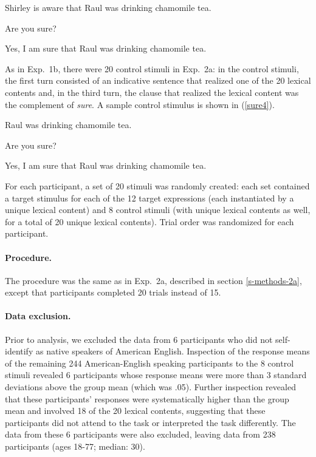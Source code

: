 \documentclass[11pt,fleqn]{article}
\newcommand{\6}{\mbox{$[\hspace*{-.6mm}[$}}
\newcommand{\9}{\mbox{$]\hspace*{-.6mm}]$}}
\begin{document}
\begin{exe}
\ex\label{sure3}
\begin{xlist}
 Shirley is aware that Raul was drinking chamomile tea.

 Are you sure?

 Yes, I am sure that Raul was drinking chamomile tea.
\end{xlist}
\end{exe}

As in Exp.~1b, there were 20 control stimuli in Exp.~2a: in the control stimuli, the first turn consisted of an indicative sentence that realized one of the 20 lexical contents and, in the third turn, the clause that realized the lexical content was the complement of {\em sure}. A sample control stimulus is shown in (\ref{sure4}).

\begin{exe}
\ex\label{sure4}
\begin{xlist}
 Raul was drinking chamomile tea.

 Are you sure?

 Yes, I am sure that Raul was drinking chamomile tea.
\end{xlist}
\end{exe}

For each participant, a set of 20 stimuli was randomly created: each set contained a target stimulus for each of the 12 target expressions (each instantiated by a unique lexical content) and 8 control stimuli (with unique lexical contents as well, for a total of 20 unique lexical contents). Trial order was randomized for each participant.

\paragraph{Procedure.} The procedure was the same as in Exp.~2a, described in section \ref{s-methods-2a}, except that participants completed 20 trials instead of 15.

\paragraph{Data exclusion.} Prior to analysis, we excluded the data from 6 participants who did not self-identify as native speakers of American English. Inspection of the response means of the remaining 244 American-English speaking participants to the 8 control stimuli revealed 6 participants whose response means were more than 3 standard deviations above the group mean (which was .05). Further inspection revealed that these participants' responses were systematically higher than the group mean and involved 18 of the 20 lexical contents, suggesting that these participants did not attend to the task or interpreted the task differently. The data from these 6 participants were also excluded, leaving data from 238 participants (ages 18-77; median: 30).
\end{document}
